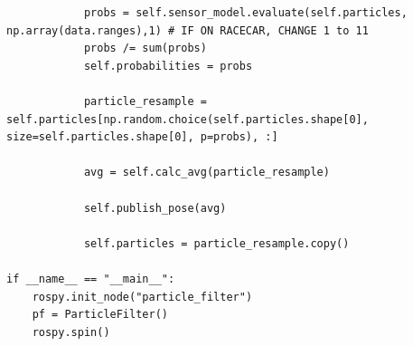 \documentclass{article}
\begin{document}
{\begin{verbatim}
            probs = self.sensor_model.evaluate(self.particles, np.array(data.ranges),1) # IF ON RACECAR, CHANGE 1 to 11
            probs /= sum(probs)
            self.probabilities = probs

            particle_resample = self.particles[np.random.choice(self.particles.shape[0], size=self.particles.shape[0], p=probs), :]

            avg = self.calc_avg(particle_resample)
            
            self.publish_pose(avg)
            
            self.particles = particle_resample.copy()

if __name__ == "__main__":
    rospy.init_node("particle_filter")
    pf = ParticleFilter()
    rospy.spin()

\end{verbatim}
}
\end{document}
